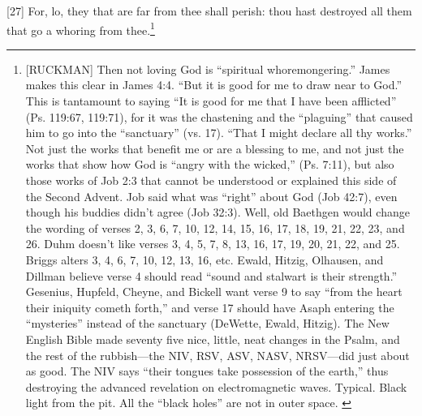[27] \textcolor[rgb]{0.00,0.00,1.00}{For, lo, they that are far from thee shall perish: thou hast destroyed all them that go a whoring from thee.}\footnote{[RUCKMAN] Then not loving God is “spiritual whoremongering.” James makes this clear in James 4:4. “But it is good for me to draw near to God.” This is tantamount to saying “It is good for me that I have been afflicted” (Ps. 119:67, 119:71), for it was the chastening and the “plaguing” that caused him to go into the “sanctuary” (vs. 17). “That I might declare all thy works.” Not just the works that benefit me or are a blessing to me, and not just the works that show how God is “angry with the wicked,” (Ps. 7:11), but also those works of Job 2:3 that cannot be understood or explained this side of the Second Advent. Job said what was “right” about God (Job 42:7), even though his buddies didn’t agree (Job 32:3). Well, old Baethgen would change the wording of verses 2, 3, 6, 7, 10, 12, 14, 15, 16, 17, 18, 19, 21, 22, 23, and 26. Duhm doesn’t like verses 3, 4, 5, 7, 8, 13, 16, 17, 19, 20, 21, 22, and 25. Briggs alters 3, 4, 6, 7, 10, 12, 13, 16, etc. Ewald, Hitzig, Olhausen, and Dillman believe verse 4 should read “sound and stalwart is their strength.”
Gesenius, Hupfeld, Cheyne, and Bickell want verse 9 to say “from the heart their iniquity cometh forth,” and verse 17 should have Asaph entering the “mysteries” instead of the sanctuary (DeWette, Ewald, Hitzig). The New English Bible made seventy five nice, little, neat changes in the Psalm, and the rest of the rubbish—the NIV, RSV, ASV, NASV, NRSV—did just about as good. The NIV says “their tongues take possession of the earth,” thus destroying the advanced revelation on electromagnetic waves. Typical. Black light from the pit. All the “black holes” are not in outer space.  \cite{Ruckman1992Psalms}  }
